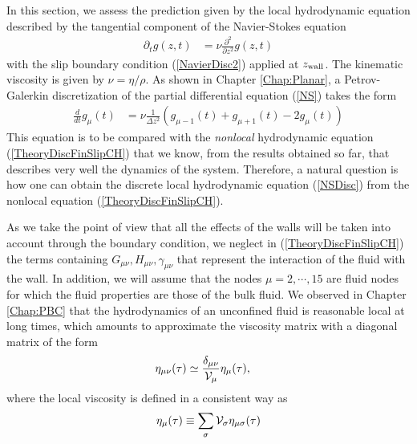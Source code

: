 \documentclass[b5paper,openright,10pt]{book}
\begin{document}
In  this  section,  we  assess  the  prediction  given  by  the  local
hydrodynamic  equation described  by the  tangential component  of the
Navier-Stokes equation
\begin{align}
  \partial_t g(z,t)&=\nu\frac{\partial^2}{\partial z^2} g(z,t)
\label{NS}
\end{align}
with  the  slip  boundary  condition  (\ref{NavierDisc2})  applied  at
$z_{\rm    wall}$.    The    kinematic   viscosity    is   given    by
$\nu=\eta/\rho$. As  shown in Chapter \ref{Chap:Planar}, a  Petrov-Galerkin discretization of
the partial differential equation (\ref{NS}) takes the form
\begin{align}
  \frac{d}{dt}g_\mu(t)&=\nu \frac{1}{\Delta z^2}(g_{\mu-1}(t)+g_{\mu+1}(t)-2g_{\mu}(t))
\label{NSDisc}
\end{align}
This  equation  is to  be  compared  with the \textit{nonlocal}  hydrodynamic
equation (\ref{TheoryDiscFinSlipCH}) that we know, from the results obtained
so   far,   that   describes   very   well   the   dynamics   of   the
system.  Therefore, a  natural  question  is how  one  can obtain  the
discrete local hydrodynamic equation (\ref{NSDisc}) from the nonlocal
equation (\ref{TheoryDiscFinSlipCH}).

As we take the point of view that all the effects of the walls will be taken
into account through the boundary  condition, we neglect in
(\ref{TheoryDiscFinSlipCH})          the           terms          containing
$G_{\mu\nu},H_{\mu\nu},\gamma_{\mu\nu}$ that represent the interaction
of the  fluid with  the wall. In addition, we will assume that
 the  nodes
$\mu=2,\cdots,15$   are   fluid   nodes for which the fluid properties are those
of the bulk fluid.
We observed in Chapter \ref{Chap:PBC}
that the hydrodynamics  of an unconfined fluid is  reasonable local at
long times, which  amounts to approximate the viscosity  matrix with a
diagonal matrix of the form
\begin{align}
  \eta_{\mu\nu}(\tau)&\simeq\frac{\delta_{\mu\nu}}{{\cal V}_\mu}\eta_\mu(\tau),
\label{etadiag}
\end{align}
where the local viscosity is defined in a consistent way as
\begin{align}
\eta_\mu(\tau)\equiv\sum_\sigma{\cal V}_\sigma \eta_{\mu\sigma}(\tau)
\label{LocVisc}
\end{align}
%
\end{document}
